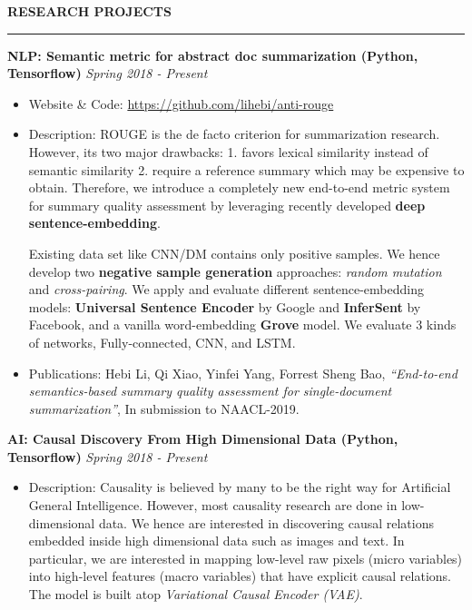 \documentclass[10pt,letterpaper]{article}
\newenvironment{mysection}[1]{ %
  \medskip
  \MakeUppercase{\bf #1}
  \medskip
  \hrule
  \begin{list}{}{
      \setlength{\leftmargin}{1.5em}
    }
  \item[]
}{
  \end{list}
}
\begin{document}
\begin{mysection}{Research Projects}

  \textbf{NLP: Semantic metric for abstract doc summarization (Python,
    Tensorflow)} \hfill \emph{Spring 2018 - Present}
  \begin{itemize}
  \item Website \& Code: \url{https://github.com/lihebi/anti-rouge}
  \item Description: ROUGE is the de facto criterion for summarization
    research.  However, its two major drawbacks: 1. favors lexical
    similarity instead of semantic similarity 2. require a reference
    summary which may be expensive to obtain.  Therefore, we introduce
    a completely new end-to-end metric system for summary quality
    assessment by leveraging recently developed \textbf{deep
      sentence-embedding}.

    Existing data set like CNN/DM contains only positive samples. We
    hence develop two \textbf{negative sample generation} approaches:
    \textit{random mutation} and \textit{cross-pairing}.  We apply and
    evaluate different sentence-embedding models: \textbf{Universal
      Sentence Encoder} by Google and \textbf{InferSent} by Facebook,
    and a vanilla word-embedding \textbf{Grove} model. We evaluate 3
    kinds of networks, Fully-connected, CNN, and LSTM.

  \item Publications: Hebi Li, Qi Xiao, Yinfei Yang, Forrest Sheng Bao,
      \textit{``End-to-end semantics-based summary quality assessment
        for single-document summarization''}, In submission to
      NAACL-2019.
  \end{itemize}
  
  \textbf{AI: Causal Discovery From High Dimensional Data (Python,
    Tensorflow)} \hfill \emph{Spring 2018 - Present}

  \begin{itemize}
  \item Description: Causality is believed by many to be the right way
    for Artificial General Intelligence. However, most causality
    research are done in low-dimensional data. We hence are interested
    in discovering causal relations embedded inside high dimensional
    data such as images and text. In particular, we are interested in
    mapping low-level raw pixels (micro variables) into high-level
    features (macro variables) that have explicit causal relations.
    The model is built atop \emph{Variational Causal Encoder (VAE)}.
  \end{itemize}
  

\end{mysection}
\end{document}
